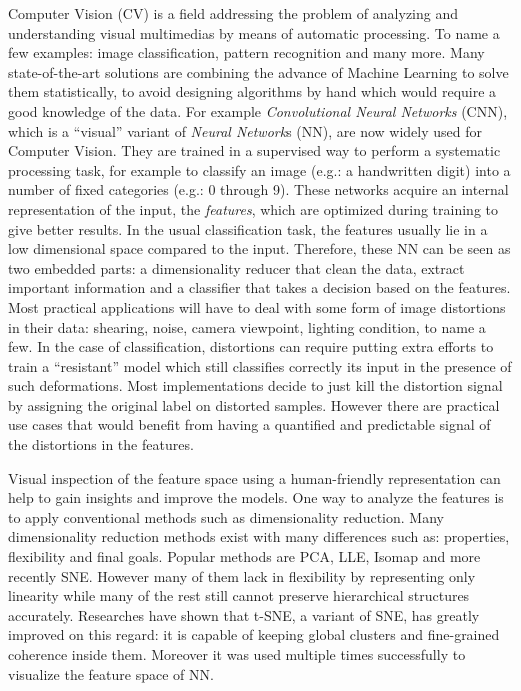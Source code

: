 \documentclass[a4paper,12pt]{report}
\newcommand{\eg}{e.g.}
\begin{document}
Computer Vision (CV) is a field addressing the problem of analyzing and understanding visual multimedias by means of automatic processing.
To name a few examples: image classification, pattern recognition and many more.
Many state-of-the-art solutions are combining the advance of Machine Learning to solve them statistically, to avoid designing algorithms by hand which would require a good knowledge of the data.
For example {\em Convolutional Neural Networks} (CNN), which is a ``visual'' variant of {\em Neural Network}s (NN), are now widely used for Computer Vision.
They are trained in a supervised way to perform a systematic processing task, for example to classify an image (\eg: a handwritten digit) into a number of fixed categories (\eg: 0 through 9).
These networks acquire an internal representation of the input, the {\em features}, which are optimized during training to give better results.
In the usual classification task, the features usually lie in a low dimensional space compared to the input.
Therefore, these NN can be seen as two embedded parts: a dimensionality reducer that clean the data, extract important information and a classifier that takes a decision based on the features.
Most practical applications will have to deal with some form of image distortions in their data: shearing, noise, camera viewpoint, lighting condition, to name a few.
In the case of classification, distortions can require putting extra efforts to train a ``resistant'' model which still classifies correctly its input in the presence of such deformations.
Most implementations decide to just kill the distortion signal by assigning the original label on distorted samples.
However there are practical use cases that would benefit from having a quantified and predictable signal of the distortions in the features.

Visual inspection of the feature space using a human-friendly representation can help to gain insights and improve the models.
One way to analyze the features is to apply conventional methods such as dimensionality reduction.
Many dimensionality reduction methods exist with many differences such as: properties, flexibility and final goals.
Popular methods are PCA, LLE, Isomap and more recently SNE.
However many of them lack in flexibility by representing only linearity while many of the rest still cannot preserve hierarchical structures accurately.
Researches have shown that t-SNE, a variant of SNE, has greatly improved on this regard: it is capable of keeping global clusters and fine-grained coherence inside them.
Moreover it was used multiple times successfully to visualize the feature space of NN.
\end{document}
